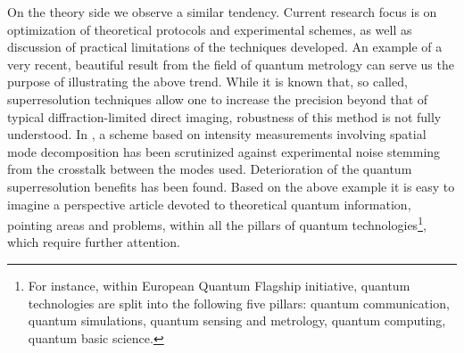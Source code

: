 \documentclass[english,aps,pra,nofootinbib,twocolumn,superscriptaddress]{revtex4-1}
\newcommand{\1}{{\rm 1\hspace{-0.9mm}l}}
\begin{document}
On the theory side we observe a similar tendency. Current research focus is on optimization of theoretical protocols and experimental schemes, as well as discussion of practical limitations of the techniques developed. An example of a very recent, beautiful result \cite{crosstalk} from the field of quantum metrology can serve us the purpose of illustrating the above trend. While it is known that, so called, superresolution techniques \cite{superresolution} allow one to increase the precision beyond that of typical diffraction-limited direct imaging, robustness of this method is not fully understood. In  \cite{crosstalk}, a scheme based on intensity measurements involving spatial mode decomposition has been scrutinized against experimental noise stemming from the crosstalk between the modes used. Deterioration of the quantum superresolution benefits has been found. Based on the above example it is easy to imagine a perspective article devoted to theoretical quantum information, pointing areas and problems, within all the pillars of quantum technologies\footnote{For instance, within European Quantum Flagship initiative, quantum technologies are split into the following five pillars: quantum communication, quantum simulations, quantum sensing and metrology, quantum computing, quantum basic science.}, which require further attention.
\end{document}
